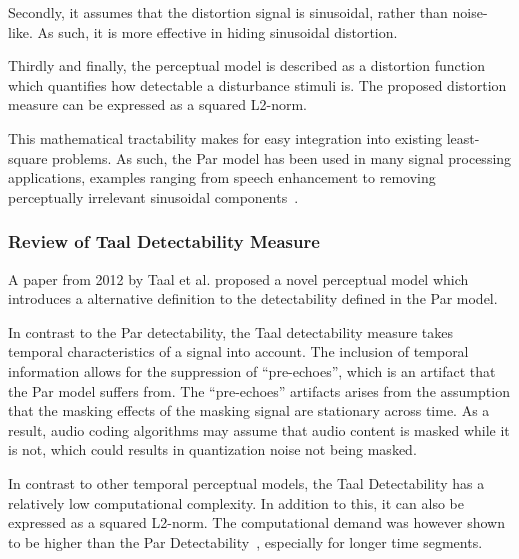 Secondly, it assumes that the distortion signal is sinusoidal, rather than noise-like.
As such, it is more effective in hiding sinusoidal distortion.

Thirdly and finally, the perceptual model is described as a distortion function which quantifies how 
detectable a disturbance stimuli is.
The proposed distortion measure can be expressed as a squared L2-norm.

This mathematical tractability makes for easy integration into existing least-square problems.
As such, the Par model has been used in many signal processing applications, 
examples ranging from speech enhancement to removing perceptually irrelevant sinusoidal 
components~\cite{balazs2009time, taal2013optimal}.

\subsubsection{Review of Taal Detectability Measure}
A paper from 2012 by Taal et al. proposed a novel perceptual model \cite{taal2012low} which introduces a
alternative definition to the detectability defined in the Par model.

In contrast to the Par detectability, the Taal detectability measure takes temporal characteristics of a signal into account.
The inclusion of temporal information allows for the suppression of ``pre-echoes'', which is an artifact that 
the Par model suffers from. 
The ``pre-echoes'' artifacts arises from the assumption that the masking effects of the masking signal are stationary across 
time. 
As a result, audio coding algorithms may assume that audio content is masked while it is not, which could results in quantization
noise not being masked.

In contrast to other temporal perceptual models, the Taal Detectability has a relatively low computational complexity.
In addition to this, it can also be expressed as a squared L2-norm.
The computational demand was however shown to be higher than the Par Detectability~\cite{taal2012low}, especially for longer time segments.
